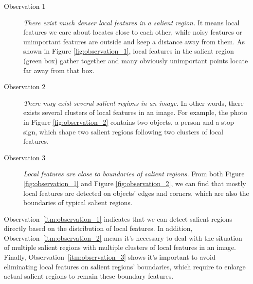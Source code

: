 \begin{description}
	
\item[Observation 1]  \textit{There exist much denser local features in a salient region.} It means local features we care about locates close to each other, while noisy features or unimportant features are outside and keep a distance away from them. As shown in Figure \ref{fig:observation_1}, local features in the salient region (green box) gather together and many obviously unimportant points locate far away from that box. 

\item[Observation 2]  \textit{There may exist several salient regions in an image.} In other words, there exists several clusters of local features in an image. For example, the photo in Figure \ref{fig:observation_2} contains two objects, a person and a stop sign, which shape two salient regions following two clusters of local features.

\item[Observation 3]  \textit{Local features are close to boundaries of salient regions.} From both Figure \ref{fig:observation_1} and Figure \ref{fig:observation_2}, we can find that mostly local features are detected on objects' edges and corners, which are also the boundaries of typical salient regions. 

\end{description}

Observation~\ref{itm:observation_1} indicates that we can detect salient regions directly based on the distribution of local features. In addition, Observation~\ref{itm:observation_2} means it's necessary to deal with the situation of multiple salient regions with multiple clusters of local features in an image. Finally, Observation~\ref{itm:observation_3} shows it's important to avoid eliminating local features on salient regions' boundaries, which require to enlarge actual salient regions to remain these boundary features.